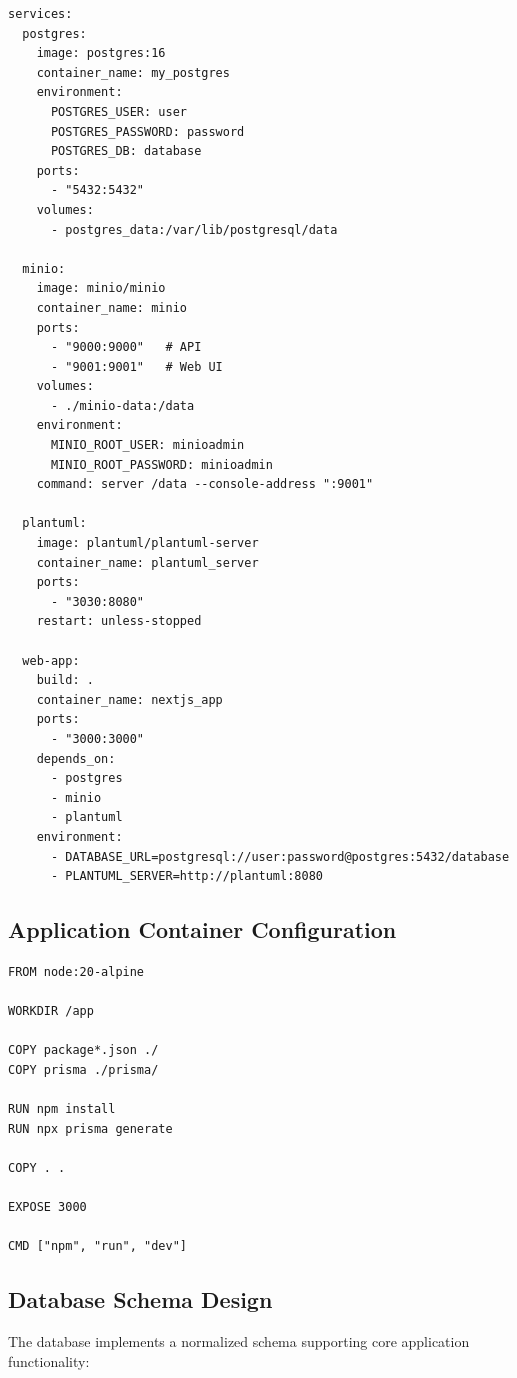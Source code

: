 \begin{lstlisting}[caption=Docker Compose Services Configuration]
services:
  postgres:
    image: postgres:16
    container_name: my_postgres
    environment:
      POSTGRES_USER: user
      POSTGRES_PASSWORD: password
      POSTGRES_DB: database
    ports:
      - "5432:5432"
    volumes:
      - postgres_data:/var/lib/postgresql/data

  minio:
    image: minio/minio
    container_name: minio
    ports:
      - "9000:9000"   # API
      - "9001:9001"   # Web UI
    volumes:
      - ./minio-data:/data
    environment:
      MINIO_ROOT_USER: minioadmin
      MINIO_ROOT_PASSWORD: minioadmin
    command: server /data --console-address ":9001"

  plantuml:
    image: plantuml/plantuml-server
    container_name: plantuml_server
    ports:
      - "3030:8080"
    restart: unless-stopped

  web-app:
    build: .
    container_name: nextjs_app
    ports:
      - "3000:3000"
    depends_on:
      - postgres
      - minio
      - plantuml
    environment:
      - DATABASE_URL=postgresql://user:password@postgres:5432/database
      - PLANTUML_SERVER=http://plantuml:8080
\end{lstlisting}

\subsection{Application Container Configuration}

\begin{lstlisting}[caption=Next.js Application Dockerfile]
FROM node:20-alpine

WORKDIR /app

COPY package*.json ./
COPY prisma ./prisma/

RUN npm install
RUN npx prisma generate

COPY . .

EXPOSE 3000

CMD ["npm", "run", "dev"]
\end{lstlisting}
\subsection{Database Schema Design}

The database implements a normalized schema supporting core application functionality:

